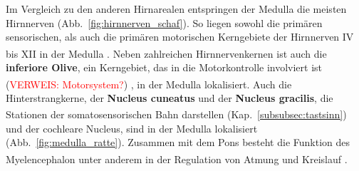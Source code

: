 \documentclass[12pt,a4paper,pdftex]{article}
\begin{document}
\noindent Im Vergleich zu den anderen Hirnarealen entspringen der Medulla die meisten Hirnnerven (Abb.~\ref{fig:hirnnerven_schaf}). So liegen sowohl die primären sensorischen, als auch die primären motorischen Kerngebiete der Hirnnerven IV bis XII in der Medulla \textsuperscript{\cite[14]{penzlin2005tierphys}}. Neben zahlreichen Hirnnervenkernen ist auch die \textbf{inferiore Olive}, ein Kerngebiet, das in die Motorkontrolle involviert ist (\textcolor{red}{VERWEIS: Motorsystem?})  \textsuperscript{\cite[9]{crossman2014neuroanatomy}}, in der Medulla lokalisiert. Auch die Hinterstrangkerne, der \textbf{Nucleus cuneatus} und der \textbf{Nucleus gracilis}, die Stationen der somatosensorischen Bahn darstellen (Kap.~\ref{subsubsec:tastsinn}) \textsuperscript{\cite[5]{trepel2011neuroanatomie}} und der cochleare Nucleus, sind in der Medulla lokalisiert (Abb.~\ref{fig:medulla_ratte}). Zusammen mit dem Pons besteht die Funktion des Myelencephalon unter anderem in der Regulation von Atmung und Kreislauf \textsuperscript{\cite[14]{penzlin2005tierphys}}.
\end{document}
